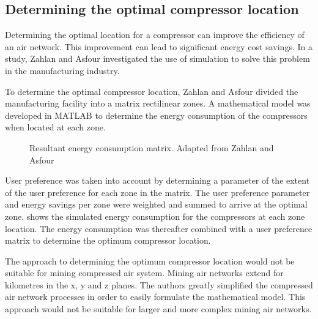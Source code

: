 \subsection{Determining the optimal compressor location}
Determining the optimal location for a compressor can improve the efficiency of an air network. This improvement can lead to significant energy cost savings. In a study, Zahlan and Asfour \cite{zahlan2015multi} investigated the use of simulation to solve this problem in the manufacturing industry. 
\par 
To determine the optimal compressor location, Zahlan and Asfour divided the manufacturing facility into a matrix rectilinear zones. A mathematical model was developed in MATLAB to determine the energy consumption of the compressors when located at each zone.
\par
\begin{figure}[!htbp]
	\centering
	\caption[Simulated energy consumption matrix]{Resultant energy consumption matrix. Adapted from Zahlan and Asfour \cite{zahlan2015multi}}
	\label{fig: EnergyconsumptionMatrix}
\end{figure} 
User preference was taken into account by determining a parameter of the extent of the user preference for each zone in the matrix. The user preference parameter and energy savings per zone were weighted and summed to arrive at the optimal zone.  shows the simulated energy consumption for the compressors at each zone location. The energy consumption was thereafter combined with a user preference matrix to determine the optimum compressor location.
\par
The approach to determining the optimum compressor location would not be suitable for mining compressed air system. Mining air networks extend for kilometres in the x, y and z planes. The authors greatly simplified the compressed air network processes in order to easily formulate the mathematical model. This approach would not be suitable for larger and more complex mining air networks.

